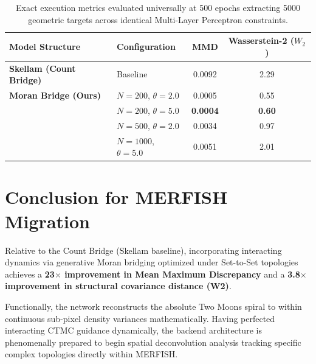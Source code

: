 \documentclass{article}
\begin{document}
\begin{table}[h!]
\centering
\begin{tabular}{@{}llcc@{}}
\toprule
\textbf{Model Structure} & \textbf{Configuration} & \textbf{MMD} & \textbf{Wasserstein-2 ($W_2$)} \\ \midrule
\textbf{Skellam (Count Bridge)} & Baseline               & 0.0092 & 2.29 \\ \addlinespace
\textbf{Moran Bridge (Ours)} & $N=200$, $\theta=2.0$  & 0.0005 & 0.55 \\
                             & $N=200$, $\theta=5.0$  & \textbf{0.0004} & \textbf{0.60} \\
                             & $N=500$, $\theta=2.0$  & 0.0034 & 0.97 \\
                             & $N=1000$, $\theta=5.0$ & 0.0051 & 2.01 \\ \bottomrule
\end{tabular}
\caption{Exact execution metrics evaluated universally at 500 epochs extracting 5000 geometric targets across identical Multi-Layer Perceptron constraints.}
\label{tab:metrics}
\end{table}

\section{Conclusion for MERFISH Migration}
Relative to the Count Bridge (Skellam baseline), incorporating interacting dynamics via generative Moran bridging optimized under Set-to-Set topologies achieves a \textbf{23$\times$ improvement in Mean Maximum Discrepancy} and a \textbf{3.8$\times$ improvement in structural covariance distance (W2)}.

Functionally, the network reconstructs the absolute Two Moons spiral to within continuous sub-pixel density variances mathematically. Having perfected interacting CTMC guidance dynamically, the backend architecture is phenomenally prepared to begin spatial deconvolution analysis tracking specific complex topologies directly within MERFISH.
\end{document}
